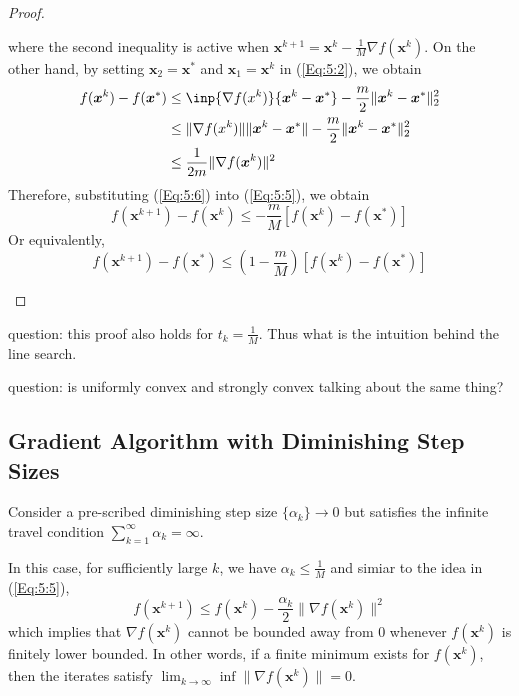 \begin{proof}
\begin{itemize}
\begin{equation}
\end{equation}
where the second inequality is active when $\bm x^{k+1} = \bm x^k - \frac{1}{M}\nabla f(\bm x^k)$. On the other hand, by setting $\bm x_2 = \bm x^*$ and $\bm x_1 = \bm x^k$ in (\ref{Eq:5:2}), we obtain
\begin{equation}\label{Eq:5:6}
\begin{aligned}
f(\bm x^k) - f(\bm x^*)&\le \inp{\nabla f(x^k)}{\bm x^k - \bm x^*}-\frac{m}{2}\|\bm x^k-\bm x^*\|_2^2\\
&\le \|\nabla f(x^k)\|\|\bm x^k - \bm x^*\| - \frac{m}{2}\|\bm x^k-\bm x^*\|_2^2\\
&\le \frac{1}{2m}\|\nabla f(\bm x^k)\|^2
\end{aligned}
\end{equation}
Therefore, substituting (\ref{Eq:5:6}) into (\ref{Eq:5:5}), we obtain
\[
f(\bm x^{k+1}) - f(\bm x^k)\le -\frac{m}{M}[f(\bm x^k) - f(\bm x^*)]
\]
Or equivalently,
\[
f(\bm x^{k+1}) - f(\bm x^*)\le\left(1-\frac{m}{M}\right)[f(\bm x^k) - f(\bm x^*)]
\]
\end{itemize}
\end{proof}
question: this proof also holds for $t_k = \frac{1}{M}$. Thus what is the intuition behind the line search.

question: is uniformly convex and strongly convex talking about the same thing?



\subsection{Gradient Algorithm with Diminishing Step Sizes}
Consider a pre-scribed diminishing step size $\{\alpha_k\}\to0$ but satisfies the infinite travel condition $\sum_{k=1}^\infty\alpha_k=\infty$. 

In this case, for sufficiently large $k$, we have $\alpha_k\le\frac{1}{M}$ and simiar to the idea in (\ref{Eq:5:5}),
\[
f(\bm x^{k+1}) \le f(\bm x^k) - \frac{\alpha_k}{2}\|\nabla f(\bm x^k)\|^2
\]
which implies that $\nabla f(\bm x^k)$ cannot be bounded away from 0 whenever $f(\bm x^k)$ is finitely lower bounded. In other words, if a finite minimum exists for $f(\bm x^k)$, then the iterates satisfy $\lim_{k\to\infty}\inf\|\nabla f(\bm x^k)\|=0$.

